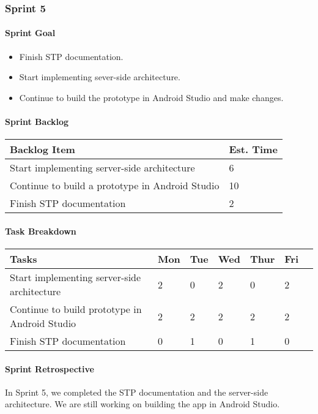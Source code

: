 \subsubsection{Sprint 5}

\paragraph{Sprint Goal}
\begin{itemize}
    \item  Finish STP documentation.
    \item  Start implementing sever-side architecture.
    \item  Continue to build the prototype in Android Studio and make changes.
\end{itemize}

\paragraph{Sprint Backlog}
\begin{table}[htbp]
    \centering
    \begin{tabularx}{\textwidth}{l|l}
        Backlog Item & Est. Time\\
        \hline
        Start implementing server-side architecture & 6\\
        Continue to build a prototype in Android Studio & 10\\
        Finish STP documentation & 2\\
    \end{tabularx}
\end{table}

\paragraph{Task Breakdown}
\begin{tabular}[htbp]
    \centering
    \begin{tabularx}{\textwidth}{l|l|l|l|l|l|l}
        Tasks &    Mon & Tue & Wed & Thur & Fri\\
        \hline
        Start implementing server-side architecture & 2 & 0 & 2 & 0 & 2\\
        Continue to build prototype in Android Studio & 2 & 2 & 2 & 2 & 2\\
        Finish STP documentation & 0 & 1 & 0 & 1 & 0\\
    \end{tabularx}
\end{tabular}

\paragraph{Sprint Retrospective}
In Sprint 5, we completed the STP documentation and the server-side architecture. We are still working on building the app in Android Studio.
